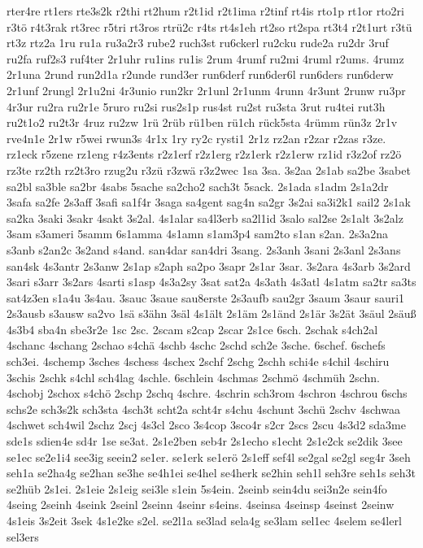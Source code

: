 {rter4re
rt1ers
rte3s2k
r2thi
rt2hum
r2t1id
r2t1ima
r2tinf
rt4is
rto1p
rt1or
rto2ri
r3tö
r4t3rak
rt3rec
r5tri
rt3ros
rtrü2c
r4ts
rt4s1eh
rt2so
rt2spa
rt3t4
r2t1urt
r3tü
rt3z
rtz2a
1ru
ru1a
ru3a2r3
rube2
ruch3st
ru6ckerl
ru2cku
rude2a
ru2dr
3ruf
ru2fa
ruf2s3
ruf4ter
2r1uhr
ru1ins
ru1is
2rum
4rumf
ru2mi
4ruml
r2ums.
4rumz
2r1una
2rund
run2d1a
r2unde
rund3er
run6derf
run6der6l
run6ders
run6derw
2r1unf
2rungl
2r1u2ni
4r3unio
run2kr
2r1unl
2r1unm
4runn
4r3unt
2runw
ru3pr
4r3ur
ru2ra
ru2r1e
5ruro
ru2si
rus2s1p
rus4st
ru2st
ru3sta
3rut
ru4tei
rut3h
ru2t1o2
ru2t3r
4ruz
ru2zw
1rü
2rüb
rü1ben
rü1ch
rück5sta
4rümm
rün3z
2r1v
rve4n1e
2r1w
r5wei
rwun3s
4r1x
1ry
ry2c
rysti1
2r1z
rz2an
r2zar
r2zas
r3ze.
rz1eck
r5zene
rz1eng
r4z3ents
r2z1erf
r2z1erg
r2z1erk
r2z1erw
rz1id
r3z2of
rz2ö
rz3te
rz2th
rz2t3ro
rzug2u
r3zü
r3zwä
r3z2wec
1sa
3sa.
3s2aa
2s1ab
sa2be
3sabet
sa2bl
sa3ble
sa2br
4sabs
5sache
sa2cho2
sach3t
5sack.
2s1ada
s1adm
2s1a2dr
3safa
sa2fe
2s3aff
3safi
sa1f4r
3saga
sa4gent
sag4n
sa2gr
3s2ai
sa3i2k1
sail2
2s1ak
sa2ka
3saki
3sakr
4sakt
3s2al.
4s1alar
sa4l3erb
sa2l1id
3salo
sal2se
2s1alt
3s2alz
3sam
s3ameri
5samm
6s1amma
4s1amn
s1am3p4
sam2to
s1an
s2an.
2s3a2na
s3anb
s2an2c
3s2and
s4and.
san4dar
san4dri
3sang.
2s3anh
3sani
2s3anl
2s3ans
san4sk
4s3antr
2s3anw
2s1ap
s2aph
sa2po
3sapr
2s1ar
3sar.
3s2ara
4s3arb
3s2ard
3sari
s3arr
3s2ars
4sarti
s1asp
4s3a2sy
3sat
sat2a
4s3ath
4s3atl
4s1atm
sa2tr
sa3ts
sat4z3en
s1a4u
3s4au.
3sauc
3saue
sau8erste
2s3aufb
sau2gr
3saum
3saur
sauri1
2s3ausb
s3ausw
sa2vo
1sä
s3ähn
3säl
4s1ält
2s1äm
2s1änd
2s1är
3s2ät
3säul
2säuß
4s3b4
sba4n
sbe3r2e
1sc
2sc.
2scam
s2cap
2scar
2s1ce
6sch.
2schak
s4ch2al
4schanc
4schang
2schao
s4chä
4schb
4schc
2schd
sch2e
3sche.
6schef.
6schefs
sch3ei.
4schemp
3sches
4schess
4schex
2schf
2schg
2schh
schi4e
s4chil
4schiru
3schis
2schk
s4chl
sch4lag
4schle.
6schlein
4schmas
2schmö
4schmüh
2schn.
4schobj
2schox
s4chö
2schp
2schq
4schre.
4schrin
sch3rom
4schron
4schrou
6schs
schs2e
sch3s2k
sch3sta
4sch3t
scht2a
scht4r
s4chu
4schunt
3schü
2schv
4schwaa
4schwet
sch4wil
2schz
2scj
4s3cl
2sco
3s4cop
3sco4r
s2cr
2scs
2scu
4s3d2
sda3me
sde1s
sdien4e
sd4r
1se
se3at.
2s1e2ben
seb4r
2s1echo
s1echt
2s1e2ck
se2dik
3see
se1ec
se2e1i4
see3ig
seein2
se1er.
se1erk
se1erö
2s1eff
sef4l
se2gal
se2gl
seg4r
3seh
seh1a
se2ha4g
se2han
se3he
se4h1ei
se4hel
se4herk
se2hin
seh1l
seh3re
seh1s
seh3t
se2hüb
2s1ei.
2s1eie
2s1eig
sei3le
s1ein
5s4ein.
2seinb
sein4du
sei3n2e
sein4fo
4seing
2seinh
4seink
2seinl
2seinn
4seinr
s4eins.
4seinsa
4seinsp
4seinst
2seinw
4s1eis
3s2eit
3sek
4s1e2ke
s2el.
se2l1a
se3lad
sela4g
se3lam
sel1ec
4selem
se4lerl
sel3ers
}
